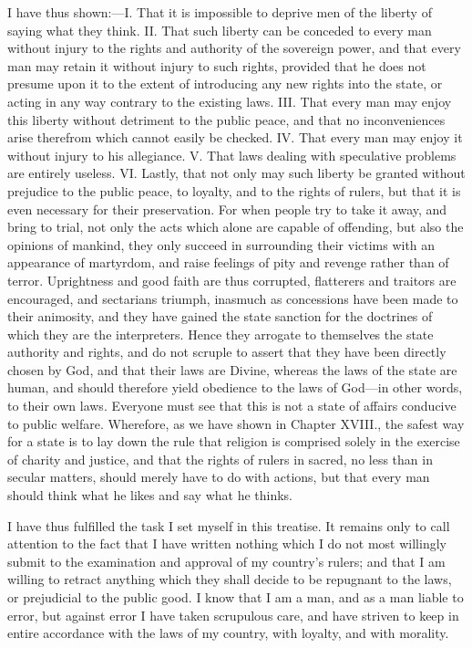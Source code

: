 I have thus shown:---I. That it is impossible to deprive men of the
liberty of saying what they think. II. That  such liberty
can be conceded to every man without injury to the rights and
authority of the sovereign power, and that every man may retain it
without injury to such rights, provided that he does not presume upon
it to the extent of introducing any new rights into the state, or
acting in any way contrary to the existing laws. III. That every man
may enjoy this liberty without detriment to the public peace, and that
no inconveniences arise therefrom which cannot easily be checked. IV.
That every man may enjoy it without injury to his allegiance. V. That
laws dealing with speculative problems are entirely useless. VI.
Lastly, that not only may such liberty be granted without prejudice to
the public peace, to loyalty, and to the rights of rulers, but that it
is even necessary for their preservation. For when people try to take
it away, and bring to trial, not only the acts which alone are capable
of offending, but also the opinions of mankind, they only succeed in
surrounding their victims with an appearance of martyrdom, and raise
feelings of pity and revenge rather than of terror. Uprightness and
good faith are thus corrupted, flatterers and traitors are encouraged,
and sectarians triumph, inasmuch as concessions have been made to
their animosity, and they have gained the state sanction for the
doctrines of which they are the interpreters. Hence they arrogate to
themselves the state authority and rights, and do not scruple to
assert that they have been directly chosen by God, and that their laws
are Divine, whereas the laws of the state are human, and should
therefore yield obedience to the laws of God---in other words, to
their own laws. Everyone must see that this is not a state of affairs
conducive to public welfare. Wherefore, as we have shown in Chapter
XVIII., the safest way for a state is to lay down the rule that
religion is comprised solely in the exercise of charity and justice,
and that the rights of rulers in sacred, no less than in secular
matters, should merely have to do with actions, but that every man
should think what he likes and say what he thinks.

I have thus fulfilled the task I set myself in this treatise. It
remains only to call attention to the fact that I have written nothing
which I do not most willingly submit to the examination and approval
of my country's rulers; and  that I am willing to retract
anything which they shall decide to be repugnant to the laws, or
prejudicial to the public good. I know that I am a man, and as a man
liable to error, but against error I have taken scrupulous care, and
have striven to keep in entire accordance with the laws of my country,
with loyalty, and with morality.

